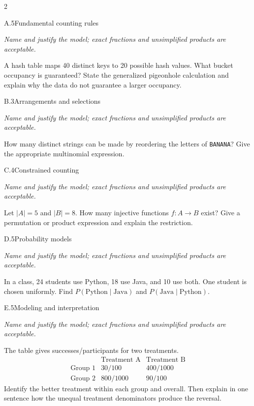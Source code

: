 \documentclass[9pt]{extarticle}
\begin{document}
\begin{multicols}{2}
\begin{CoreProblem}{A.5}{Fundamental counting rules}
{\scriptsize\textit{Name and justify the model; exact fractions and unsimplified products are acceptable.}\par}
A hash table maps 40 distinct keys to 20 possible hash values. What
    bucket occupancy is guaranteed? State the generalized pigeonhole calculation
    and explain why the data do not guarantee a larger occupancy.
\end{CoreProblem}
\begin{CoreProblem}{B.3}{Arrangements and selections}
{\scriptsize\textit{Name and justify the model; exact fractions and unsimplified products are acceptable.}\par}
How many distinct strings can be made by reordering the letters of
    \texttt{BANANA}? Give the appropriate multinomial expression.
\end{CoreProblem}
\begin{CoreProblem}{C.4}{Constrained counting}
{\scriptsize\textit{Name and justify the model; exact fractions and unsimplified products are acceptable.}\par}
Let $|A|=5$ and $|B|=8$. How many injective functions $f:A\to B$
    exist? Give a permutation or product expression and explain the restriction.
\end{CoreProblem}
\columnbreak
\begin{CoreProblem}{D.5}{Probability models}
{\scriptsize\textit{Name and justify the model; exact fractions and unsimplified products are acceptable.}\par}
In a class, 24 students use Python, 18 use Java, and 10 use both.
    One student is chosen uniformly. Find
    $P(\text{Python}\mid\text{Java})$ and
    $P(\text{Java}\mid\text{Python})$.
\end{CoreProblem}
\begin{CoreProblem}{E.5}{Modeling and interpretation}
{\scriptsize\textit{Name and justify the model; exact fractions and unsimplified products are acceptable.}\par}
The table gives successes/participants for two treatments.
    \[
    \begin{array}{c|cc}
      &\text{Treatment A}&\text{Treatment B}\\\hline
      \text{Group 1}&30/100&400/1000\\
      \text{Group 2}&800/1000&90/100
    \end{array}
    \]
    Identify the better treatment within each group and overall. Then explain in
    one sentence how the unequal treatment denominators produce the reversal.
\end{CoreProblem}
\end{multicols}
\end{document}
